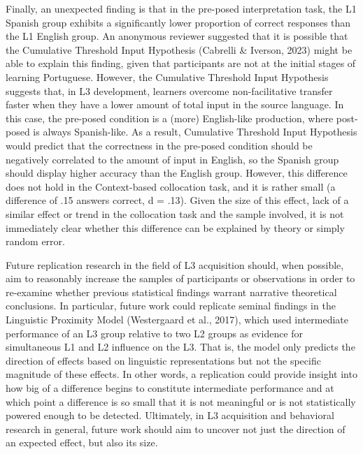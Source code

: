 \documentclass[
  man,floatsintext]{apa6}
\begin{document}
Finally, an unexpected finding is that in the pre-posed interpretation task, the L1 Spanish group exhibits a significantly lower proportion of correct responses than the L1 English group.
An anonymous reviewer suggested that it is possible that the Cumulative Threshold Input Hypothesis (Cabrelli \& Iverson, 2023) might be able to explain this finding, given that participants are not at the initial stages of learning Portuguese.
However, the Cumulative Threshold Input Hypothesis suggests that, in L3 development, learners overcome non-facilitative transfer faster when they have a lower amount of total input in the source language.
In this case, the pre-posed condition is a (more) English-like production, where post-posed is always Spanish-like.
As a result, Cumulative Threshold Input Hypothesis would predict that the correctness in the pre-posed condition should be negatively correlated to the amount of input in English, so the Spanish group should display higher accuracy than the English group.
However, this difference does not hold in the Context-based collocation task, and it is rather small (a difference of .15 answers correct, d = .13).
Given the size of this effect, lack of a similar effect or trend in the collocation task and the sample involved, it is not immediately clear whether this difference can be explained by theory or simply random error.

Future replication research in the field of L3 acquisition should, when possible, aim to reasonably increase the samples of participants or observations in order to re-examine whether previous statistical findings warrant narrative theoretical conclusions. In particular, future work could replicate seminal findings in the Linguistic Proximity Model (Westergaard et al., 2017), which used intermediate performance of an L3 group relative to two L2 groups as evidence for simultaneous L1 and L2 influence on the L3. That is, the model only predicts the direction of effects based on linguistic representations but not the specific magnitude of these effects. In other words, a replication could provide insight into how big of a difference begins to constitute intermediate performance and at which point a difference is so small that it is not meaningful or is not statistically powered enough to be detected. Ultimately, in L3 acquisition and behavioral research in general, future work should aim to uncover not just the direction of an expected effect, but also its size.
\end{document}
